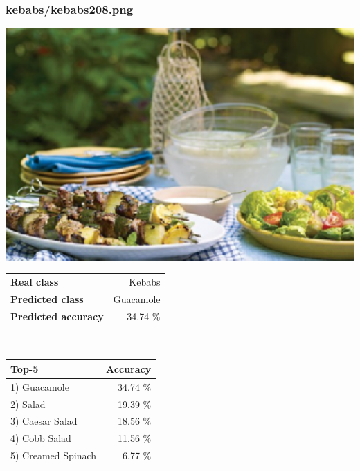 \subsubsection{kebabs/kebabs208.png}

\begin{minipage}[t]{0.4\textwidth}
	\vspace{0pt}
	\includegraphics[width=\linewidth]{images/evaluation-images/kebabs/kebabs208.png}
\end{minipage}
\hfill
\begin{minipage}[t]{0.5\textwidth}
	\vspace{0pt}\raggedright
	\begin{tabularx}{\textwidth}{X r}
		\small \textbf{Real class} & \small Kebabs\\
		\small \textbf{Predicted class} & \small Guacamole\\
		\small \textbf{Predicted accuracy} & \small 34.74 \%
    \end{tabularx}\\
    
    \vspace{6pt}
	\begin{tabularx}{\textwidth}{X r}
        \small \textbf{Top-5} & \small \textbf{Accuracy} \\
        \hline
		\small 1) Guacamole & \small 34.74 \%\\\small 2) Salad & \small 19.39 \%\\\small 3) Caesar Salad & \small 18.56 \%\\\small 4) Cobb Salad & \small 11.56 \%\\\small 5) Creamed Spinach & \small 6.77 \%
    \end{tabularx}
\end{minipage}
    
